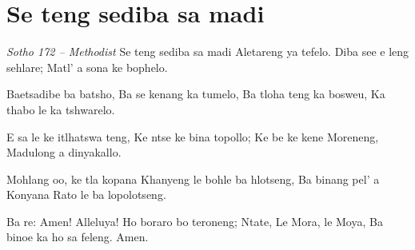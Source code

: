 \starttocol
\chapter{Se teng sediba sa madi}
\nexttocol
\hfill{\it Sotho 172 -- Methodist}
\stoptocol
\starttocol
\startlines
{\sc Se teng} sediba sa madi
Aletareng ya tefelo.
Diba see e leng sehlare;
Matl' a sona ke bophelo.

Baetsadibe ba batsho,
Ba se kenang ka tumelo,
Ba tloha teng ka bosweu,
Ka thabo le ka tshwarelo.

E sa le ke itlhatswa teng,
Ke ntse ke bina topollo;
Ke be ke kene Moreneng,
Madulong a dinyakallo.

Mohlang oo, ke tla kopana
Khanyeng le bohle ba hlotseng,
Ba binang pel' a Konyana
Rato le ba lopolotseng.

Ba re: Amen! Alleluya!
Ho boraro bo teroneng;
Ntate, Le Mora, le Moya,
Ba binoe ka ho sa feleng. 
\hfill Amen.
\stoplines
\nexttocol

\stoptocol
